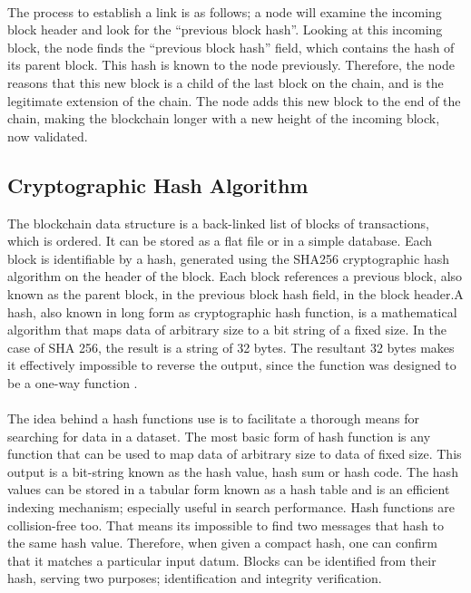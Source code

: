 \paragraph{}The process to establish a link is as follows; a node will examine the incoming block header and look for the “previous block hash”. Looking at this incoming block, the node finds the “previous block hash” field, which contains the hash of its parent block. This hash is known to the node previously. Therefore, the node reasons that this new block is a child of the last block on the chain, and is the legitimate extension of the chain. The node adds this new block to the end of the chain, making the blockchain longer with a new height of the incoming block, now validated.
\subsection{Cryptographic Hash Algorithm}
The blockchain data structure is a back-linked list of blocks of transactions, which is ordered.
It can be stored as a flat file or in a simple database. Each block is identifiable by a hash,
generated using the SHA256 cryptographic hash algorithm on the header of the block. Each
block references a previous block, also known as the parent block, in the previous block hash
field, in the block header.A hash, also known in long form as cryptographic hash function, is a
mathematical algorithm that maps data of arbitrary size to a bit string of a fixed size. In the
case of SHA 256, the result is a string of 32 bytes. The resultant 32 bytes makes it effectively
impossible to reverse the output, since the function was designed to be a one-way function .
\paragraph{}The idea behind a hash functions use is to facilitate a thorough means for searching for data
in a dataset. The most basic form of hash function is any function that can be used to map
data of arbitrary size to data of fixed size. This output is a bit-string known as the hash value,
hash sum or hash code. The hash values can be stored in a tabular form known as a hash table
and is an efficient indexing mechanism; especially useful in search performance. Hash functions
are collision-free too. That means its impossible to find two messages that hash to the same
hash value. Therefore, when given a compact hash, one can confirm that it matches a particular
input datum. Blocks can be identified from their hash, serving two purposes; identification and
integrity verification.
